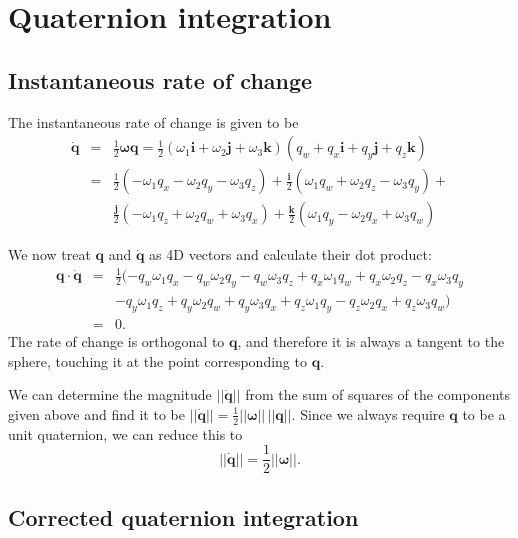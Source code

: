 \section{Quaternion integration\label{quatProofs}}
\subsection{Instantaneous rate of change\label{quatRateOfChangeOrthogonal}}
The instantaneous rate of change is given to be
\begin{eqnarray*}
\dot{\mathbf{q}} & = & \frac{1}{2}\bm{\omega}\mathbf{q} =
    \frac{1}{2}(\omega_1\mathbf{i} + \omega_2\mathbf{j} + \omega_3\mathbf{k})
    (q_w + q_x\mathbf{i} + q_y\mathbf{j} + q_z\mathbf{k}) \\
& = & \frac{1}{2} ( - \omega_1 q_x - \omega_2 q_y - \omega_3 q_z ) +
    \frac{\mathbf{i}}{2} ( \omega_1 q_w + \omega_2 q_z - \omega_3 q_y ) + \\
&&  \frac{\mathbf{j}}{2} (-\omega_1 q_z + \omega_2 q_w + \omega_3 q_x ) +
    \frac{\mathbf{k}}{2} ( \omega_1 q_y - \omega_2 q_x + \omega_3 q_w )
\end{eqnarray*}

We now treat $\mathbf{q}$ and $\dot{\mathbf{q}}$ as 4D vectors and calculate
their dot product:
\begin{eqnarray*}
\mathbf{q}\cdot\dot{\mathbf{q}} & = & \frac{1}{2} (
    - q_w \omega_1 q_x - q_w \omega_2 q_y - q_w \omega_3 q_z
    + q_x \omega_1 q_w + q_x \omega_2 q_z - q_x \omega_3 q_y \\
&&  - q_y \omega_1 q_z + q_y \omega_2 q_w + q_y \omega_3 q_x
    + q_z \omega_1 q_y - q_z \omega_2 q_x + q_z \omega_3 q_w ) \\
& = & 0.
\end{eqnarray*}
The rate of change is orthogonal to $\mathbf{q}$, and therefore it is always
a tangent to the sphere, touching it at the point corresponding to $\mathbf{q}$.

We can determine the magnitude $||\dot{\mathbf{q}}||$ from the sum of squares of the
components given above and find it to be
$||\dot{\mathbf{q}}|| = \frac{1}{2}||\bm{\omega}||\,||\mathbf{q}||$. Since we always
require $\mathbf{q}$ to be a unit quaternion, we can reduce this to
\begin{equation}
\label{quatRateOfChangeMagnitude}
||\dot{\mathbf{q}}|| = \frac{1}{2}||\bm{\omega}||.
\end{equation}

\subsection{Corrected quaternion integration\label{quatIntegrationDerivation}}

